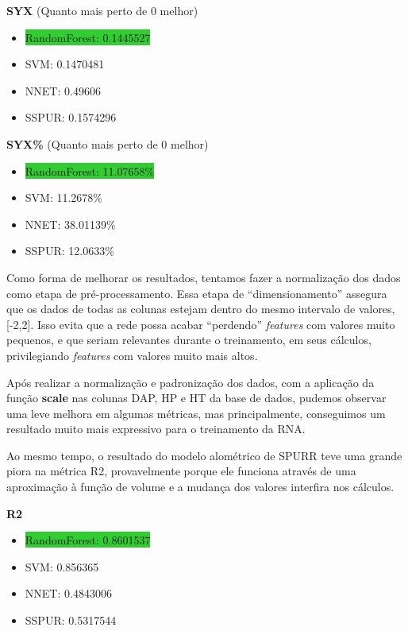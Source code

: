\begin{adjustwidth}{1.5em}{}
\textbf{SYX} (Quanto mais perto de 0 melhor)
\end{adjustwidth}
\begin{itemize}
    \item \colorbox{LimeGreen}{RandomForest: 0.1445527}
    \item SVM: 0.1470481
    \item NNET: 0.49606
    \item SSPUR: 0.1574296
\end{itemize}

\begin{adjustwidth}{1.5em}{}
\textbf{SYX\%} (Quanto mais perto de 0 melhor)
\end{adjustwidth}
\begin{itemize}
    \item \colorbox{LimeGreen}{RandomForest: 11.07658\%}
    \item SVM: 11.2678\%
    \item NNET: 38.01139\%
    \item SSPUR: 12.0633\%
\end{itemize}

Como forma de melhorar os resultados, tentamos fazer a normalização dos dados como etapa de pré-processamento. Essa etapa de ``dimensionamento'' assegura que os dados de todas as colunas estejam dentro do mesmo intervalo de valores, [-2,2]. Isso evita que a rede possa acabar ``perdendo'' \textit{features} com valores muito pequenos, e que seriam relevantes durante o treinamento, em seus cálculos, privilegiando \textit{features} com valores muito mais altos.

Após realizar a normalização e padronização dos dados, com a aplicação da função \textbf{scale} nas colunas DAP, HP e HT da base de dados, pudemos observar uma leve melhora em algumas métricas, mas principalmente, conseguimos um resultado muito mais expressivo para o treinamento da RNA.

Ao mesmo tempo, o resultado do modelo alométrico de SPURR teve uma grande piora na métrica R2, provavelmente porque ele funciona através de uma aproximação à função de volume e a mudança dos valores interfira nos cálculos. 


\begin{adjustwidth}{1.5em}{}
\textbf{R2}
\end{adjustwidth}
\begin{itemize}
    \item \colorbox{LimeGreen}{RandomForest: 0.8601537} \FancyUpArrow
    \item SVM: 0.856365
    \item NNET: 0.4843006 \FancyUpArrow 
    \item SSPUR: 0.5317544 \FancyUpDown
\end{itemize}

